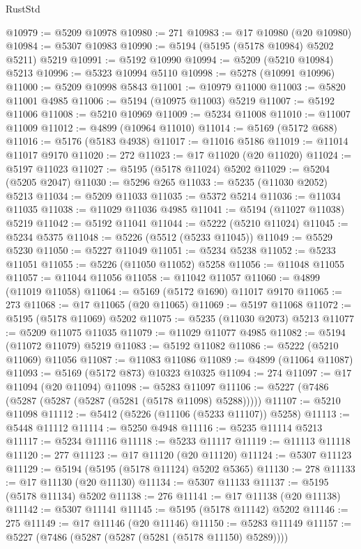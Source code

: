 \begin{lexlean}{RustStd}
\begin{coremodule}
@10979 := @5209 @10978
@10980 := 271
@10983 := @17 @10980 (@20 @10980)
@10984 := @5307 @10983
@10990 := @5194 (@5195 (@5178 @10984) @5202 @5211) @5219
@10991 := @5192 @10990
@10994 := @5209 (@5210 @10984) @5213
@10996 := @5323 @10994 @5110
@10998 := @5278 (@10991 @10996)
@11000 := @5209 @10998 @5843
@11001 := @10979 @11000
@11003 := @5820 @11001 @4985
@11006 := @5194 (@10975 @11003) @5219
@11007 := @5192 @11006
@11008 := @5210 @10969
@11009 := @5234 @11008
@11010 := @11007 @11009
@11012 := @4899 (@10964 @11010)
@11014 := @5169 (@5172 @688)
@11016 := @5176 (@5183 @4938)
@11017 := @11016 @5186
@11019 := @11014 @11017 @9170
@11020 := 272
@11023 := @17 @11020 (@20 @11020)
@11024 := @5197 @11023
@11027 := @5195 (@5178 @11024) @5202
@11029 := @5204 (@5205 @2047)
@11030 := @5296 @265
@11033 := @5235 (@11030 @2052) @5213
@11034 := @5209 @11033
@11035 := @5372 @5214
@11036 := @11034 @11035
@11038 := @11029 @11036 @4985
@11041 := @5194 (@11027 @11038) @5219
@11042 := @5192 @11041
@11044 := @5222 (@5210 @11024)
@11045 := @5234 @5375
@11048 := @5226 (@5512 (@5233 @11045))
@11049 := @5529 @5230
@11050 := @5227 @11049
@11051 := @5234 @5238
@11052 := @5233 @11051
@11055 := @5226 (@11050 @11052) @5258
@11056 := @11048 @11055
@11057 := @11044 @11056
@11058 := @11042 @11057
@11060 := @4899 (@11019 @11058)
@11064 := @5169 (@5172 @1690) @11017 @9170
@11065 := 273
@11068 := @17 @11065 (@20 @11065)
@11069 := @5197 @11068
@11072 := @5195 (@5178 @11069) @5202
@11075 := @5235 (@11030 @2073) @5213
@11077 := @5209 @11075 @11035
@11079 := @11029 @11077 @4985
@11082 := @5194 (@11072 @11079) @5219
@11083 := @5192 @11082
@11086 := @5222 (@5210 @11069) @11056
@11087 := @11083 @11086
@11089 := @4899 (@11064 @11087)
@11093 := @5169 (@5172 @873) @10323 @10325
@11094 := 274
@11097 := @17 @11094 (@20 @11094)
@11098 := @5283 @11097
@11106 := @5227 (@7486 (@5287 (@5287 (@5287 (@5281 (@5178 @11098) @5288)))))
@11107 := @5210 @11098
@11112 := @5412 (@5226 (@11106 (@5233 @11107)) @5258)
@11113 := @5448 @11112
@11114 := @5250 @4948
@11116 := @5235 @11114 @5213
@11117 := @5234 @11116
@11118 := @5233 @11117
@11119 := @11113 @11118
@11120 := 277
@11123 := @17 @11120 (@20 @11120)
@11124 := @5307 @11123
@11129 := @5194 (@5195 (@5178 @11124) @5202 @5365)
@11130 := 278
@11133 := @17 @11130 (@20 @11130)
@11134 := @5307 @11133
@11137 := @5195 (@5178 @11134) @5202
@11138 := 276
@11141 := @17 @11138 (@20 @11138)
@11142 := @5307 @11141
@11145 := @5195 (@5178 @11142) @5202
@11146 := 275
@11149 := @17 @11146 (@20 @11146)
@11150 := @5283 @11149
@11157 := @5227 (@7486 (@5287 (@5287 (@5281 (@5178 @11150) @5289))))

\end{coremodule}
\end{lexlean}
